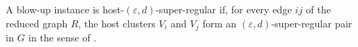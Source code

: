 \begin{definition}
A blow-up instance  is host-$(\varepsilon,d)$-super-regular if, for every edge $ij$ of the reduced graph $R$, the host clusters $V_i$ and $V_j$ form an $(\varepsilon,d)$-super-regular pair in $G$ in the sense of .
\end{definition}
